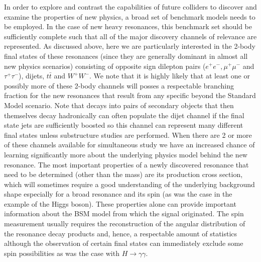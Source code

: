 \documentclass[a4paper,11pt]{article}
\begin{document}
In order to explore and contrast the capabilities of future colliders to discover and examine the properties of new physics, a broad set of benchmark models needs to be employed. In the
case of new heavy resonances, this benchmark set should be sufficiently complete such that all of the major discovery channels of relevance are represented. As discussed above, here we
are particularly interested in the 2-body final states of these resonances (since they are generally dominant in almost all new physics scenarios) consisting of opposite sign dilepton
pairs ($e^+e^-, \mu^+\mu^-$ and $\tau^+\tau^-$), dijets, $ t\bar t$ and $W^+W^-$.  We note that it is highly likely that at least one or possibly more of these 2-body channels will posses
a respectable branching fraction for the new resonances that result from any specific beyond the Standard Model scenario. Note that decays into pairs of secondary objects that
then themselves decay hadronically can often populate the dijet channel if the final state jets are sufficiently boosted so this channel can represent many different final states unless
substructure studies are performed.  When there are 2 or more of these channels available for simultaneous study we have an increased chance of learning significantly more about
the underlying physics model behind the new resonance. The most important properties of a newly discovered resonance that need to be determined (other than the mass) are its
production cross section, which will sometimes require a good understanding of the underlying background shape especially for a broad resonance and its spin (as was the case in
the example of the Higgs boson). These properties alone can provide important information about the BSM model from which the signal originated. The spin measurement usually requires
the reconstruction of the angular distribution of the resonance decay products and, hence, a respectable amount of statistics although the observation of certain final states can
immediately exclude some spin possibilities as was the case with $H\rightarrow \gamma \gamma$.
\end{document}
